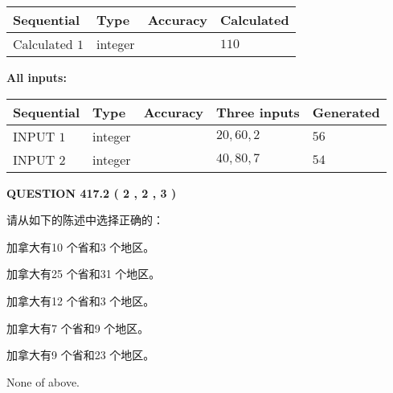 \documentclass{ctexart}
\begin{document}
   
   
   
\noindent{}
   
   
  
  
\noindent\begin{tabular}{|l|l|l|l|}
\hline
 Sequential & Type & Accuracy & Calculated \\ 
\hline
 
 
  Calculated $  1 $ & integer &  & 
  $ 110 $ 
 \\  \hline  
 \end{tabular}
   
   
   
   
\noindent\vspace{0.1in}\hspace{-0.08in} {\textbf{\Large{All inputs: }}}
   
   
  
  
\noindent\begin{tabular}{|l|l|l|l|l|}
\hline
 Sequential & Type & Accuracy & Three inputs & Generated \\ 
\hline
 
 
  INPUT $  1 $ & integer &  & $
 20
 , 
 60
 , 
 2
 $ & $ 56 $ 
 \\  \hline  
 
 
  INPUT $  2 $ & integer &  & $
 40
 , 
 80
 , 
 7
 $ & $ 54 $ 
 \\  \hline  
 \end{tabular}
   
   
  
\vspace{0.2in}
  
{\textbf{\Large{QUESTION
417.2 
 ( 2 , 2 , 3 )
}}}
  
  
请从如下的陈述中选择正确的：
 
 
加拿大有10 个省和3 个地区。
 
 
加拿大有25 个省和31 个地区。
 
 
加拿大有12 个省和3 个地区。
 
 
加拿大有7 个省和9 个地区。
 
 
加拿大有9 个省和23 个地区。
 
 
 None of above.
 
 
\noindent{}
 
\end{document}
